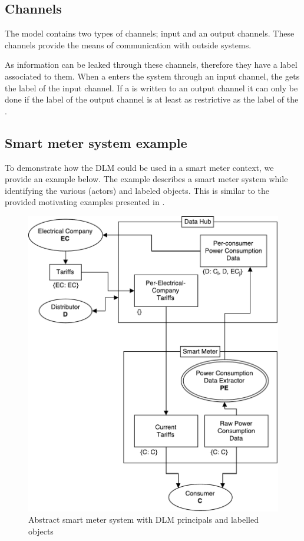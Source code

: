 \subsection{Channels}
The model contains two types of channels; input and an output channels.
These channels provide the means of communication with outside systems.

As information can be leaked through these channels, therefore they have a label associated to them.
When a \xvalue{} enters the system through an input channel, the \xvalue{} gets the label of the input channel.
If a \xvalue{} is written to an output channel it can only be done if the label of the output channel is at least as restrictive as the label of the \xvalue{}.

\subsection{Smart meter system example}\label{dlm-example}
To demonstrate how the DLM could be used in a smart meter context, we provide an example below.
The example describes a smart meter system while identifying the various \principals{} (actors) and labeled objects.
This is similar to the provided motivating examples presented in \citet{myers1997decentralized}.

\begin{figure}[h]
\centering
\includegraphics[width=\textwidth]{figures/dlm_sm_example.pdf}
\caption{Abstract smart meter system with DLM principals and labelled objects}
\label{dlm:sm_example}
\end{figure}

